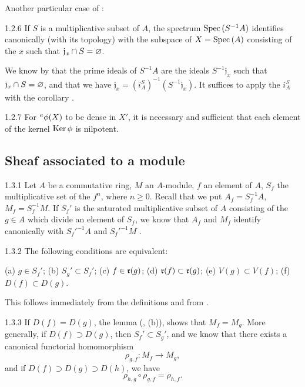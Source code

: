 Another particular case of :
\begin{envs}[Corollary]{1.2.6}
\label{cor-1.1.2.6}
If $S$ is a multiplicative subset of $A$, the spectrum ${\mathop{\mathrm{Spec}}\nolimits}\,(S^{-1}A)$ identifies
canonically (with its topology) with the subspace of $X={\mathop{\mathrm{Spec}}\nolimits}\,(A)$ consisting of the $x$
such that $\mathfrak{j}_x\cap S=\varnothing$.
\end{envs}

We know by  that the prime ideals of $S^{-1}A$ are the ideals
$S^{-1}\mathfrak{j}_x$ such that $\mathfrak{j}_x\cap S=\varnothing$, and that we have
$\mathfrak{j}_x=(i_A^S)^{-1}(S^{-1}\mathfrak{j}_x)$. It suffices to apply the $i_A^S$
with the corollary .

\begin{envs}[Corollary]{1.2.7}
\label{cor-1.1.2.7}
For $^a\phi(X)$ to be dense in $X'$, it is necessary and sufficient that each element
of the kernel ${\mathop{\mathrm{Ker}}\nolimits}\,\phi$ is nilpotent.
\end{envs}

\subsection{Sheaf associated to a module}
\label{1-schemes-1.3}

\begin{env}{1.3.1}
\label{env-1.1.3.1}
Let $A$ be a commutative ring, $M$ an $A$-module, $f$ an element of $A$, $S_f$ the
multiplicative set of the $f^n$, where $n\geqslant 0$. Recall that we put $A_f=S_f^{-1}A$,
$M_f=S_f^{-1}M$. If $S_f'$ is the saturated multiplicative subset of $A$ consisting of the
$g\in A$ which divide an element of $S_f$, we know that $A_f$ and $M_f$ identify canonically
with ${S_f'}^{-1}A$ and ${S_f'}^{-1}M$ .
\end{env}

\begin{envs}[Lemma]{1.3.2}
\label{lem-1.1.3.2}
The following conditions are equivalent:
\begin{center}
\rm{(a)} $g\in S_f'$;
\rm{(b)} $S_g'\subset S_f'$;
\rm{(c)} $f\in\mathfrak{r}(g)$;
\rm{(d)} $\mathfrak{r}(f)\subset\mathfrak{r}(g)$;
\rm{(e)} $V(g)\subset V(f)$;
\rm{(f)} $D(f)\subset D(g)$.
\end{center}
\end{envs}
This follows immediately from the definitions and from .

\begin{env}{1.3.3}
\label{env-1.1.3.3}
If $D(f)=D(g)$, the lemma (, (b)), shows that $M_f=M_g$. More generally, if
$D(f)\supset D(g)$, then $S_f'\subset S_g'$, and we know  that there exists
a canonical functorial homomorphism
\[
  \rho_{g,f}:M_f\longrightarrow M_g,
\]
and if $D(f)\supset D(g)\supset D(h)$, we have 
\[
  \rho_{h,g}\circ\rho_{g,f}=\rho_{h,f}.
  \tag{1.3.3.1}
\]
\end{env}

